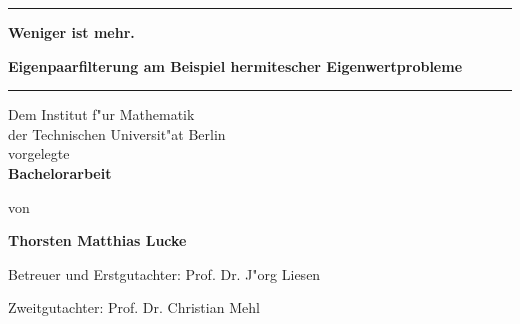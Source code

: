 \begin{titlepage}
  \begin{center}
    \vspace*{1cm}

\hrule \vspace{0.5cm}
    \Huge
    \textbf{\glqq Weniger ist mehr.\grqq}

    \vspace{0.5cm}
    \LARGE
    \textbf{Eigenpaarfilterung am Beispiel hermitescher Eigenwertprobleme}

\vspace{0.5cm} \hrule

    \vfill

    \small
    Dem Institut f"ur Mathematik\\
    der Technischen Universit"at Berlin\\
    vorgelegte\\

    \vspace{0.5cm}
    \LARGE
    \textbf{Bachelorarbeit}

    \vspace{1.5cm}

    \small
    von

    \vspace{0.5cm}
    \LARGE
    \textbf{Thorsten Matthias Lucke}

    \vfill

    \end{center}
    Betreuer und Erstgutachter: Prof. Dr. J"org Liesen

    Zweitgutachter: Prof. Dr. Christian Mehl



\end{titlepage}
